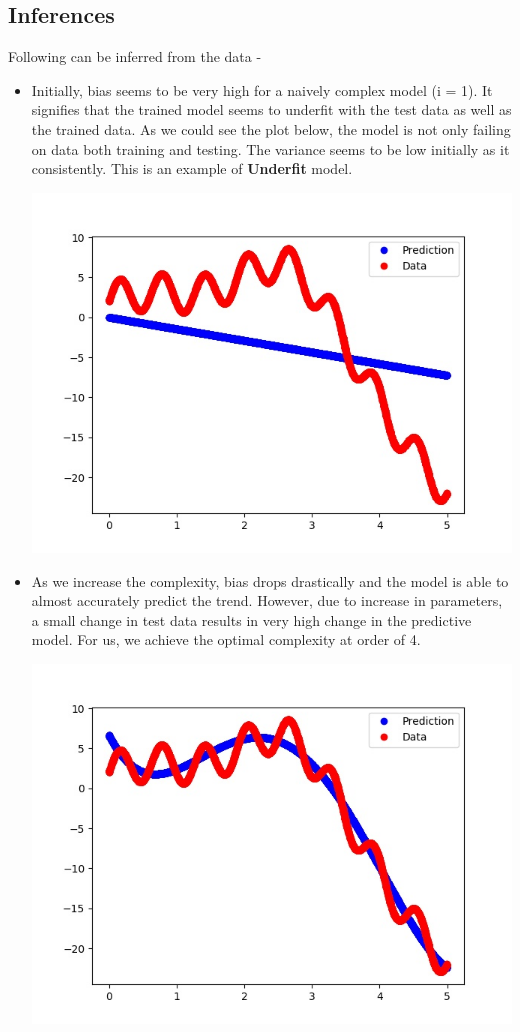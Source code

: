 \documentclass[11pt]{article}
\begin{document}
	\subsection{Inferences}
		Following can be inferred from the data - 
	\begin{itemize}
		\item Initially, bias seems to be very high for a naively complex model (i = 1). It signifies that the trained model seems to underfit with the test data as well as the trained data. As we could see the plot below, the model is not only failing on data both training and testing. The variance seems to be low initially as it consistently. This is an example of \textbf{Underfit} model.
			\begin{center}
		\hspace{-1.5cm}\includegraphics[scale=0.8]{../q1fig1.jpg}
	\end{center}
		\item As we increase the complexity, bias drops drastically and the model is able to almost accurately predict the trend. However, due to increase in parameters, a small change in test data results in very high change in the predictive model. For us, we achieve the optimal complexity at order of 4. 
			\begin{center}
		\hspace{-1.5cm}	\includegraphics[scale=0.8]{../q1fig4.jpg}

\end{center}
\end{itemize}
\end{document}
